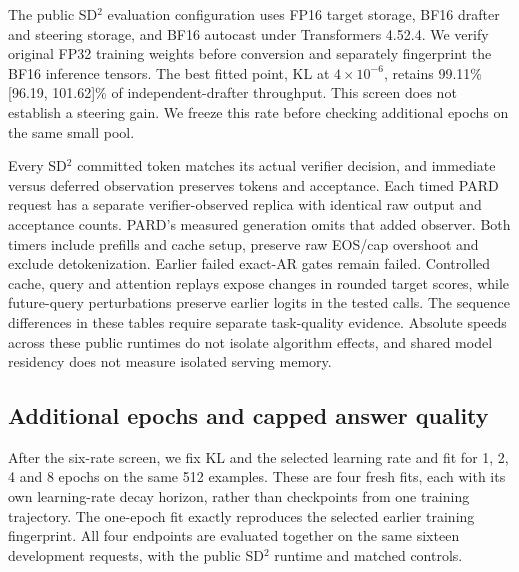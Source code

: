 \documentclass{article}
\begin{document}
The public SD$^2$ evaluation configuration uses FP16 target storage,
BF16 drafter and steering storage, and BF16 autocast under
Transformers 4.52.4. We verify original FP32 training weights before
conversion and separately fingerprint the BF16 inference tensors.
The best fitted point, KL at $4\times10^{-6}$, retains 99.11\%
[96.19, 101.62]\% of independent-drafter throughput. This screen does
not establish a steering gain. We freeze this rate before checking
additional epochs on the same small pool.

\begin{table}[H]
\caption{Released PARD with zero new-target fitting, Transformers
4.51.3, BF16 weights, eager attention and static caches. The released
checkpoint carries inherited proposer training.}
\label{tab:pard-development}
\centering\footnotesize

\end{table}

Every SD$^2$ committed token matches its actual verifier decision, and
immediate versus deferred observation preserves tokens and acceptance.
Each timed PARD request has a separate verifier-observed replica with
identical raw output and acceptance counts. PARD's measured generation
omits that added observer. Both timers include prefills and cache setup,
preserve raw EOS/cap overshoot and exclude detokenization.
Earlier failed exact-AR gates remain failed. Controlled cache, query and
attention replays expose changes in rounded target scores, while
future-query perturbations preserve earlier logits in the tested calls.
The sequence differences in these tables require separate task-quality
evidence. Absolute speeds across these public runtimes do not isolate
algorithm effects, and shared model residency does not measure isolated
serving memory.

\clearpage
\subsection{Additional epochs and capped answer quality}

After the six-rate screen, we fix KL and the selected learning rate
and fit for 1, 2, 4 and 8 epochs on the same 512 examples. These are
four fresh fits, each with its own learning-rate decay horizon, rather
than checkpoints from one training trajectory. The one-epoch fit exactly
reproduces the selected earlier training fingerprint. All four endpoints
are evaluated together on the same sixteen development requests, with
the public SD$^2$ runtime and matched controls.
\end{document}
